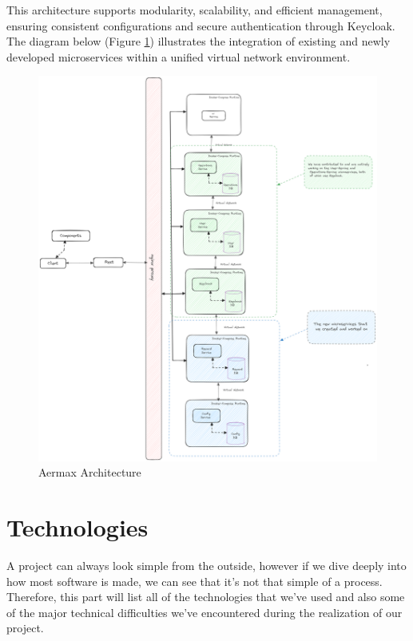 This architecture supports modularity, scalability, and efficient management, ensuring consistent configurations and secure authentication through Keycloak. The diagram below (Figure \ref{fig:aermax-architecture}) illustrates the integration of existing and newly developed microservices within a unified virtual network environment.
\begin{figure}[H]
    \centering
    \includegraphics[width=1\textwidth]{src/assets/chapters/AermaxArchitecture.png}
    \caption{Aermax Architecture}
    \label{fig:aermax-architecture}
\end{figure}


\section{Technologies}
A project can always look simple from the outside, however if we dive deeply into how most software is made, we can see that it's not that simple of a process.
Therefore, this part will list all of the technologies that we've used and also some of the major technical difficulties we've encountered during the realization of our project.

\medskip

